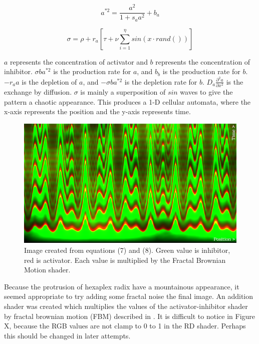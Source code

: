 \documentclass[a4paper]{article}
\begin{document}
\begin{equation*}
	a^{*2} = \frac{a^2}{1+s_a a^2} + b_a
\end{equation*}

\begin{equation*}
\sigma = \rho + r_a  [\tau + \nu \sum_{i=1}^{\eta}{sin(x \cdot rand())}]
\end{equation*}

$a$ represents the concentration of activator and $b$ represents the concentration of inhibitor. $\sigma b a^{*2}$ is the production rate for $a$, and $b_b$ is the production rate for $b$. $-r_a a$ is the depletion of $a$, and $-\sigma b a^{*2}$ is the depletion rate for $b$. $D_a \frac{\partial^2 a }{\partial x^2}$ is the exchange by diffusion. $\sigma$ is mainly a superposition of $sin$ waves to give the pattern a chaotic appearance. This produces a 1-D cellular automata, where the x-axis represents the position and the y-axis represents time.

\begin{figure}[h]
	\centering\includegraphics[scale=0.8]{./img/meinhardt-hexaplex-activator-inhibitor.png}
	\caption{Image created from equations (7) and (8). Green value is inhibitor, red is activator. Each value is multiplied by the Fractal Brownian Motion shader. \cite{rd-fbm}}
	\label{activator-inhibitor} %
\end{figure}

Because the protrusion of hexaplex radix have a mountainous appearance, it seemed appropriate to try adding some fractal noise the final image. An addition shader was created which multiplies the values of the activator-inhibitor shader by fractal brownian motion (FBM) described in \cite{fbm}. It is difficult to notice in Figure X, because the RGB values are not clamp to 0 to 1 in the RD shader. Perhaps this should be changed in later attempts.
\end{document}
